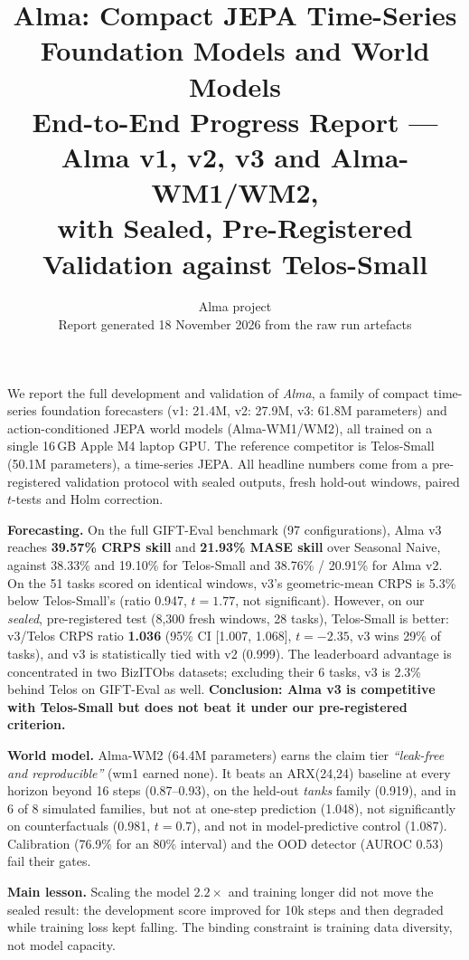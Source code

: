 \documentclass[10pt,a4paper]{extarticle}
\title{\vspace{-1.2cm}\textbf{Alma: Compact JEPA Time-Series Foundation Models and World Models}\\[4pt]
\large End-to-End Progress Report --- Alma v1, v2, v3 and Alma-WM1/WM2,\\ with Sealed, Pre-Registered Validation against Telos-Small}
\author{Alma project\\ \small Report generated 18 November 2026 from the raw run artefacts}
\date{}
\begin{document}
\maketitle
\vspace{-0.6cm}

\begin{tcolorbox}[colback=gray!6,colframe=gray!50,boxrule=0.5pt,arc=1pt,left=6pt,right=6pt,top=4pt,bottom=4pt,title=\textbf{Abstract},fonttitle=\small,coltitle=black,colbacktitle=gray!20]
\small
We report the full development and validation of \emph{Alma}, a family of compact time-series foundation
forecasters (v1: 21.4M, v2: 27.9M, v3: 61.8M parameters) and action-conditioned JEPA world models
(Alma-WM1/WM2), all trained on a single 16\,GB Apple M4 laptop GPU. The reference competitor is
Telos-Small (50.1M parameters), a time-series JEPA. All headline numbers come from a pre-registered
validation protocol with sealed outputs, fresh hold-out windows, paired $t$-tests and Holm correction.

\textbf{Forecasting.} On the full GIFT-Eval benchmark (97 configurations), Alma v3 reaches
\textbf{39.57\% CRPS skill} and \textbf{21.93\% MASE skill} over Seasonal Naive, against 38.33\% and 19.10\% for
Telos-Small and 38.76\% / 20.91\% for Alma v2. On the 51 tasks scored on identical windows, v3's
geometric-mean CRPS is 5.3\% below Telos-Small's (ratio 0.947, $t=1.77$, not significant). However, on our
\emph{sealed}, pre-registered test (8{,}300 fresh windows, 28 tasks), Telos-Small is better:
v3/Telos CRPS ratio \textbf{1.036} (95\% CI [1.007, 1.068], $t=-2.35$, v3 wins 29\% of tasks), and v3 is
statistically tied with v2 (0.999). The leaderboard advantage is concentrated in two BizITObs datasets;
excluding their 6 tasks, v3 is 2.3\% behind Telos on GIFT-Eval as well. \textbf{Conclusion: Alma v3 is
competitive with Telos-Small but does not beat it under our pre-registered criterion.}

\textbf{World model.} Alma-WM2 (64.4M parameters) earns the claim tier
\emph{``leak-free and reproducible''} (wm1 earned none). It beats an ARX(24,24) baseline at every horizon
beyond 16 steps (0.87--0.93), on the held-out \emph{tanks} family (0.919), and in 6 of 8 simulated
families, but not at one-step prediction (1.048), not significantly on counterfactuals (0.981, $t=0.7$),
and not in model-predictive control (1.087). Calibration (76.9\% for an 80\% interval) and the OOD
detector (AUROC 0.53) fail their gates.

\textbf{Main lesson.} Scaling the model $2.2\times$ and training longer did not move the sealed result:
the development score improved for 10k steps and then degraded while training loss kept falling.
The binding constraint is training data diversity, not model capacity.
\end{tcolorbox}
\end{document}
